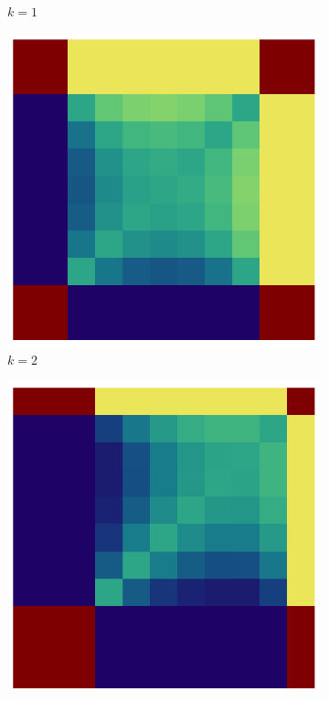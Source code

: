 \documentclass{article}
\theoremstyle{definition}
\begin{document}
\begin{figure}[H]
\begin{subfigure}[b]{0.185\textwidth}
        \caption{$k=1$}
        \label{fig:ppkBG_4_1}
    \end{subfigure}
    \hspace{0.00\textwidth} %
    \begin{subfigure}[b]{0.185\textwidth}
        \includegraphics[width=\textwidth]{img/ppkB_Plot_4_2_10.pdf}
        \caption{$k=2$}
        \label{fig:ppkBG_4_2}
    \end{subfigure}
    \hspace{0.00\textwidth} %
        \begin{subfigure}[b]{0.185\textwidth}
        \includegraphics[width=\textwidth]{img/ppkB_Plot_4_3_10.pdf}

\end{subfigure}
\end{figure}
\end{document}
